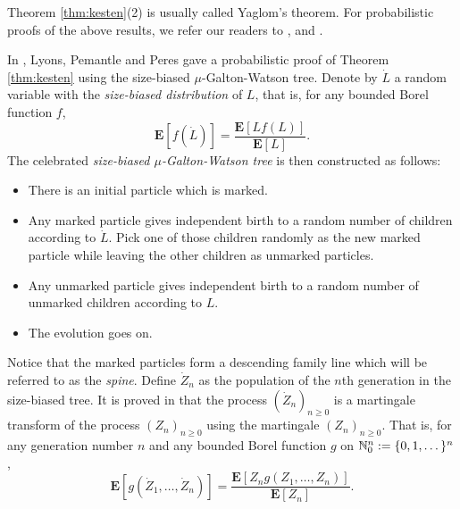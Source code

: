 \documentclass[12pt]{amsart}
\numberwithin{equation}{section}
\newcommand{\defn}[1]{{\em #1}}
\newcommand{\expr}[1]{\left( #1 \right)}
\newcommand{\brac}[1]{\left[ #1 \right]}
\newcommand{\expct}{\mathbf E}
\begin{document}
Theorem \ref{thm:kesten}(2)
	is usually called Yaglom's theorem.
	For probabilistic proofs of the above results, we refer our readers to \cite{lyons1995conceptual}, \cite{geiger1999elementary} and \cite{geiger2000new}.
\par
	In \cite{lyons1995conceptual}, Lyons, Pemantle and Peres gave a 
probabilistic proof of Theorem \ref{thm:kesten} 
using the size-biased $\mu$-Galton-Watson tree.
	Denote by $\dot L$ a random variable with the \defn{size-biased distribution} of $L$, that is, for any bounded Borel function $f$,
\begin{equation*}
		\expct\brac{f\expr{\dot L}}
	=
		\frac{\expct\brac{Lf(L)}}{\expct\brac{L}}.
\end{equation*}
The celebrated \defn{size-biased $\mu$-Galton-Watson tree} is 
then constructed as follows:
\begin{itemize}
\item
	There is an initial particle which is marked.
\item
	Any marked particle gives independent birth to a random number of children according to $\dot L$. Pick one of those children randomly as the new marked particle while leaving the other children as unmarked particles.
\item
	Any unmarked particle gives independent birth to a random number of unmarked children according to $L$.
\item
	The evolution goes on.
\end{itemize}
\par
	Notice that the marked particles form a descending family line which will be 
	referred to as the \defn{spine}.
	Define $\dot Z_n$ as the population of the $n$th generation in the size-biased tree.
	It is proved in \cite{lyons1995conceptual} that the process $(\dot Z_n)_{n\ge 0}$ is a martingale transform of the process $(Z_n)_{n\ge 0}$ using the martingale $(Z_n)_{n\ge 0}.$
	That is, for any generation number $n$ and any bounded Borel function $g$ on
		$\mathbb N_0^{n} := \{0,1,\dots\}^n$,
\begin{equation}
\label{eq:htransformation}
				\expct\brac{g\expr{\dot Z_1,\dots,\dot Z_n}}
	=
                \frac{\expct\brac{Z_n g\expr{Z_1,\dots, Z_n}}}{\expct\brac{Z_n}}.
\end{equation}
\par
\end{document}

